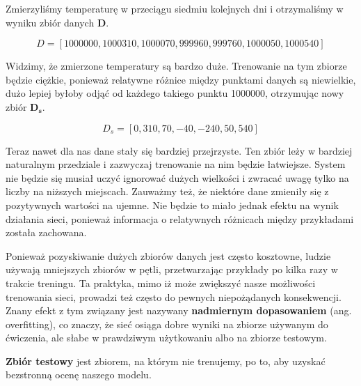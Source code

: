 \noindent Zmierzyliśmy temperaturę w przeciągu siedmiu kolejnych dni i otrzymaliśmy w wyniku zbiór danych $\boldsymbol{D}$.\newline

\begin{equation}
D = [1000000, 1000310, 1000070, 999960, 999760, 1000050, 1000540]
\end{equation}

\noindent Widzimy, że zmierzone temperatury są bardzo duże. Trenowanie na tym zbiorze będzie ciężkie, ponieważ relatywne różnice między punktami danych są niewielkie, dużo lepiej byłoby odjąć od każdego takiego punktu 1000000, otrzymując nowy zbiór $\boldsymbol{D_s}$.\newline

\begin{equation}
D_s = [0, 310, 70, -40, -240, 50, 540]
\end{equation}

\noindent Teraz nawet dla nas dane stały się bardziej przejrzyste. Ten zbiór leży w bardziej naturalnym przedziale i zazwyczaj trenowanie na nim będzie łatwiejsze. System nie będzie się musiał uczyć ignorować dużych wielkości i zwracać uwagę tylko na liczby na niższych miejscach. Zauważmy też, że niektóre dane zmieniły się z pozytywnych wartości na ujemne. Nie będzie to miało jednak efektu na wynik działania sieci, ponieważ informacja o relatywnych różnicach między przykładami została zachowana.\newline

Ponieważ pozyskiwanie dużych zbiorów danych jest często kosztowne, ludzie używają mniejszych zbiorów w pętli, przetwarzając przykłady po kilka razy w trakcie treningu. Ta praktyka, mimo iż może zwiększyć nasze możliwości trenowania sieci, prowadzi też często do pewnych niepożądanych konsekwencji. Znany efekt z tym związany jest nazywany \textbf{nadmiernym dopasowaniem} (ang. overfitting), co znaczy, że sieć osiąga dobre wyniki na zbiorze używanym do ćwiczenia, ale słabe w prawdziwym użytkowaniu albo na zbiorze testowym.\newline

\noindent \textbf{Zbiór testowy} jest zbiorem, na którym nie trenujemy, po to, aby uzyskać bezstronną ocenę naszego modelu.\newline

